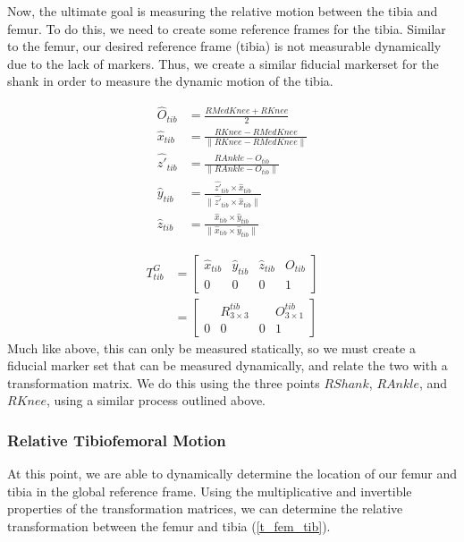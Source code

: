 \documentclass{article}
\begin{document}
    Now, the ultimate goal is measuring the relative motion between the tibia and femur. To do this, we need to create some reference frames for the tibia. Similar to the femur, our desired reference frame (tibia) is not measurable dynamically due to the lack of markers. Thus, we create a similar fiducial markerset for the shank in order to measure the dynamic motion of the tibia.

    \begin{equation}
        \begin{aligned}
            \hat{O}_{tib} &= \frac{RMedKnee + RKnee}{2}\\
            \hat{x}_{tib} & = \frac{RKnee - RMedKnee}{\|RKnee - RMedKnee\|} \\
            \hat{z'}_{tib} &= \frac{RAnkle - O_{tib}}{\|RAnkle - O_{tib}\|} \\
            \hat{y}_{tib} &= \frac{\hat{z'}_{tib} \times \hat{x}_{tib}}{\|\hat{z'}_{tib} \times \hat{x}_{tib}\|} \\
            \hat{z}_{tib} & = \frac{\hat{x}_{tib} \times \hat{y}_{tib}}{\|\hat{x}_{tib} \times \hat{y}_{tib}\|}
        \end{aligned}
        \label{tib_rf}
    \end{equation}

    \begin{equation}
        \begin{aligned}
            T^{G}_{tib} &= \begin{bmatrix}
                \hat{x}_{tib} &\hat{y}_{tib} &\hat{z}_{tib} & O_{tib} \\
                0 & 0 & 0 & 1
            \end{bmatrix} \\
            &= \begin{bmatrix}
                & R^{tib}_{3 \times 3} & & O^{tib}_{3 \times 1} \\
                0 & 0 & 0 & 1
            \end{bmatrix}
        \end{aligned}
        \label{t_gt}
    \end{equation}
    Much like above, this can only be measured statically, so we must create a fiducial marker set that can be measured dynamically, and relate the two with a transformation matrix. We do this using the three points $RShank$, $RAnkle$, and $RKnee$, using a similar process outlined above.

    \subsubsection{Relative Tibiofemoral Motion}
    At this point, we are able to dynamically determine the location of our femur and tibia in the global reference frame. Using the multiplicative and invertible properties of the transformation matrices, we can determine the relative transformation between the femur and tibia (\ref{t_fem_tib}).
\end{document}
